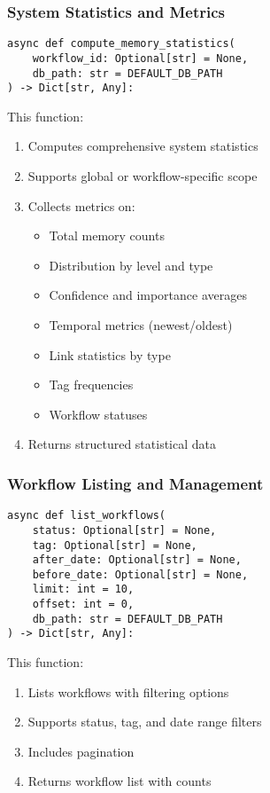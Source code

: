 \documentclass[12pt,a4paper]{article}
\begin{document}
\subsubsection*{System Statistics and Metrics}
\begin{pageablecode}
\begin{verbatim}
async def compute_memory_statistics(
    workflow_id: Optional[str] = None,
    db_path: str = DEFAULT_DB_PATH
) -> Dict[str, Any]:
\end{verbatim}
\end{pageablecode}
This function:
\begin{enumerate}[label=\arabic*.]
    \item Computes comprehensive system statistics
    \item Supports global or workflow-specific scope
    \item Collects metrics on:
    \begin{itemize}
        \item Total memory counts
        \item Distribution by level and type
        \item Confidence and importance averages
        \item Temporal metrics (newest/oldest)
        \item Link statistics by type
        \item Tag frequencies
        \item Workflow statuses
    \end{itemize}
    \item Returns structured statistical data
\end{enumerate}

\subsubsection*{Workflow Listing and Management}
\begin{pageablecode}
\begin{verbatim}
async def list_workflows(
    status: Optional[str] = None,
    tag: Optional[str] = None,
    after_date: Optional[str] = None,
    before_date: Optional[str] = None,
    limit: int = 10,
    offset: int = 0,
    db_path: str = DEFAULT_DB_PATH
) -> Dict[str, Any]:
\end{verbatim}
\end{pageablecode}
This function:
\begin{enumerate}[label=\arabic*.]
    \item Lists workflows with filtering options
    \item Supports status, tag, and date range filters
    \item Includes pagination
    \item Returns workflow list with counts
\end{enumerate}
\end{document}
